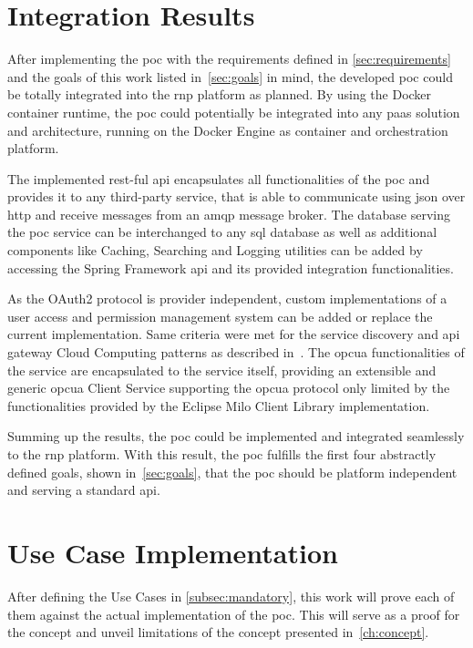 \documentclass[
a4paper,
twoside,
headsepline,
cleardoublepage=empty,
parskip=half,
draft=false
]{scrbook}
\begin{document}
		\section{Integration Results}\label{sec:integration_results}

			After implementing the \gls{poc} with the requirements defined in \cref{sec:requirements} and the goals of this work listed in~\cref{sec:goals} in mind, the developed \gls{poc} could be totally integrated into the \gls{rnp} platform as planned. By using the Docker container runtime, the \gls{poc} could potentially be integrated into any \gls{paas} solution and architecture, running on the Docker Engine as container and orchestration platform.

			The implemented \gls{rest}-ful \gls{api} encapsulates all functionalities of the \gls{poc} and provides it to any third-party service, that is able to communicate using \gls{json} over \gls{http} and receive messages from an \gls{amqp} message broker. The database serving the \gls{poc} service can be interchanged to any \gls{sql} database as well as additional components like Caching, Searching and Logging utilities can be added by accessing the Spring Framework \gls{api} and its provided integration functionalities.

			As the OAuth2 protocol is provider independent, custom implementations of a user access and permission management system can be added or replace the current implementation. Same criteria were met for the service discovery and \gls{api} gateway Cloud Computing patterns as described in~\cite{leymann2011cloud}.
			The \gls{opcua} functionalities of the service are encapsulated to the service itself, providing an extensible and generic \gls{opcua} Client Service supporting the \gls{opcua} protocol only limited by the functionalities provided by the Eclipse Milo Client Library implementation.

			Summing up the results, the \gls{poc} could be implemented and integrated seamlessly to the \gls{rnp} platform. With this result, the \gls{poc} fulfills the first four abstractly defined goals, shown in~\cref{sec:goals}, that the \gls{poc} should be platform independent and serving a standard \gls{api}.

		\section{Use Case Implementation}\label{sec:use_cases_implementation}

			After defining the Use Cases in \cref{subsec:mandatory}, this work will prove each of them against the actual implementation of the \gls{poc}. This will serve as a proof for the concept and unveil limitations of the concept presented in~\cref{ch:concept}.
\end{document}
